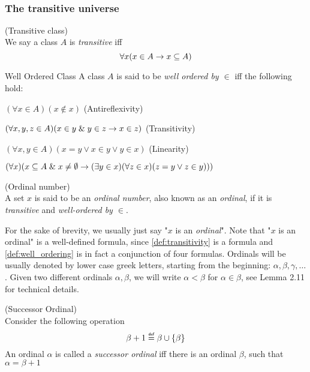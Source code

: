 \

\subsubsection{The transitive universe}
\begin{definition}{(Transitive class)}\label{def:transitivity}\\
We say a class $A$ is \emph{transitive} iff
\begin{equation}
\forall x(x \in A \rightarrow x \subseteq A)
\end{equation}
\end{definition}

\begin{definition}{Well Ordered Class}\label{def:well_ordering}
A class $A$ is said to be \emph{well ordered by $\in$} iff the following hold:
\bce[(i)]
\item $(\forall x \in A)(x \not\in x)$ (Antireflexivity)
\item $(\forall x, y, z \in A)(x \in y \mathrel{\&} y \in z \rightarrow x \in z)$ (Transitivity)
\item $(\forall x, y \in A)(x = y \lor x \in y \lor y \in x)$ (Linearity)
\item $(\forall x)(x \subseteq A \mathrel{\&} x \neq \emptyset \rightarrow (\exists y \in x)(\forall z \in x)(z = y \lor z \in y)))$ %
\ece
\end{definition}

\begin{definition}{(Ordinal number)}\label{def:ordinal}\\
A set $x$ is said to be an \emph{ordinal number}, also known as an \emph{ordinal}, if it is \emph{transitive} and \emph{well-ordered by $\in$}. 
\end{definition}
For the sake of brevity, we usually just say "$x$ is an \emph{ordinal}". 
Note that "$x$ is an ordinal" is a well-defined formula, since \ref{def:transitivity} is a formula and \ref{def:well_ordering} is in fact a conjunction of four formulas.
Ordinals will be usually denoted by lower case greek letters, starting from the beginning: $\alpha, \beta, \gamma, \ldots$.
Given two different ordinals $\alpha, \beta$, we will write $\alpha < \beta$ for $\alpha \in \beta$, see \cite{JechBook}{Lemma 2.11} for technical details.

\begin{definition}{(Successor Ordinal)}\label{def:successor_ordinal}\\
Consider the following operation
\begin{equation}
\beta + 1 \defeq \beta \cup \{\beta\}
\end{equation}
An ordinal $\alpha$ is called a \emph{successor ordinal} iff there is an ordinal $\beta$, such that $\alpha = \beta+1$
\end{definition}

